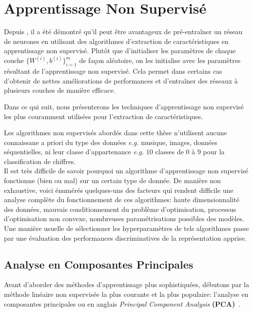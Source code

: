 \section{Apprentissage Non Supervisé}

Depuis \citep{Hinton06,Bengio-nips-2006}, il a été démontré qu'il peut être
avantageux de pré-entraîner un réseau de neurones en utilisant des algorithmes
d'extraction de caractéristiques en apprentissage non supervisé. Plutôt que
d'initialiser les paramètres de chaque couche $\lbrace W^{(i)},b^{(i)}
\rbrace_{i=1}^{m}$ de façon aléatoire, on les initialise avec les paramètres
résultant de l'apprentissage non supervisé.  Cela permet dans certains cas
d'obtenir de nettes améliorations de performances et d'entraîner des réseaux à
plusieurs couches de manière efficace.

Dans ce qui suit, nous présenterons les techniques d'apprentissage non
supervisé les plus couramment utilisées pour l'extraction de caractéristiques.

Les algorithmes non supervisés abordés dans cette thèse n'utilisent aucune connaissane a priori du type des données
\textit{e.g.} musique, images, données séquentielles, ni leur classe
d'appartenance \textit{e.g.} $10$ classes de $0$ à $9$ pour la classification
de chiffres.  \\

Il est très difficile de savoir pourquoi un algorithme d'apprentissage non
supervisé fonctionne (bien ou mal) sur un certain type de donnée.  De manière
non exhaustive, voici énumérés quelques-uns des facteurs qui rendent difficile
une analyse complète du fonctionnement de ces algorithmes: haute
dimensionnalité des données, mauvais conditionnement du problème
d'optimisation, processus d'optimisation non convexe, nombreuses
paramétrisations possibles des modèles. \\

Une manière usuelle de sélectionner les hyperparamètres de tels algorithmes passe 
par une évaluation des performances discriminatives de la
représentation apprise.

\subsection{Analyse en Composantes Principales} \label{sec:pca}

Avant d'aborder des méthodes d'apprentissage plus sophistiquées, débutons par  
la méthode linéaire non supervisée la plus courante et la plus
populaire: l'analyse en composantes principales ou en anglais \textit{Principal
Component Analysis} \textbf{(PCA)}~\citep{Pearson-1901,Hotelling1933}.

